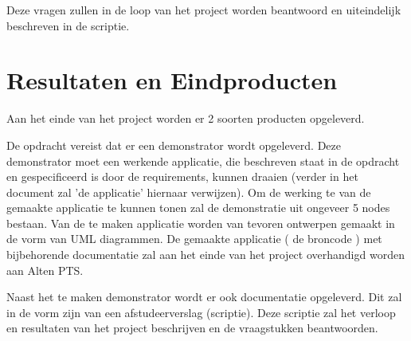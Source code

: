 \documentclass{../local}
\begin{document}
Deze vragen zullen in de loop van het project worden beantwoord en uiteindelijk beschreven in de scriptie.

\section{Resultaten en Eindproducten}
Aan het einde van het project worden er 2 soorten producten opgeleverd.

De opdracht vereist dat er een demonstrator wordt opgeleverd. Deze demonstrator moet een werkende applicatie, die beschreven staat in de opdracht en gespecificeerd is door de requirements, kunnen draaien (verder in het document zal 'de applicatie' hiernaar verwijzen). Om de werking te van de gemaakte applicatie te kunnen tonen zal de demonstratie uit ongeveer 5 nodes bestaan. Van de te maken applicatie worden van tevoren ontwerpen gemaakt in de vorm van UML diagrammen. De gemaakte applicatie ( de broncode ) met bijbehorende documentatie zal aan het einde van het project overhandigd worden aan Alten PTS.

Naast het te maken demonstrator wordt er ook documentatie opgeleverd. Dit zal in de vorm zijn van een afstudeerverslag (scriptie). Deze scriptie zal het verloop en resultaten van het project beschrijven en de vraagstukken beantwoorden.
\end{document}
